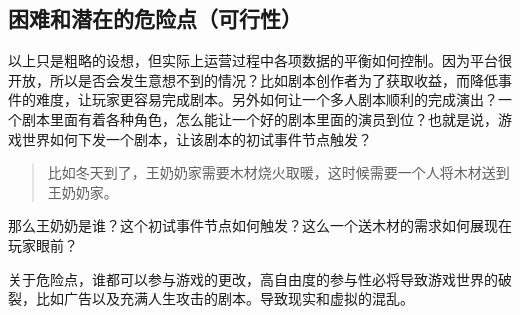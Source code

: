 \documentclass[
]{article}
\begin{document}
\hypertarget{header-n17}{%
\subsection{困难和潜在的危险点（可行性）}\label{header-n17}}

以上只是粗略的设想，但实际上运营过程中各项数据的平衡如何控制。因为平台很开放，所以是否会发生意想不到的情况？比如剧本创作者为了获取收益，而降低事件的难度，让玩家更容易完成剧本。另外如何让一个多人剧本顺利的完成演出？一个剧本里面有着各种角色，怎么能让一个好的剧本里面的演员到位？也就是说，游戏世界如何下发一个剧本，让该剧本的初试事件节点触发？

\begin{quote}
比如冬天到了，王奶奶家需要木材烧火取暖，这时候需要一个人将木材送到王奶奶家。
\end{quote}

那么王奶奶是谁？这个初试事件节点如何触发？这么一个送木材的需求如何展现在玩家眼前？

关于危险点，谁都可以参与游戏的更改，高自由度的参与性必将导致游戏世界的破裂，比如广告以及充满人生攻击的剧本。导致现实和虚拟的混乱。
\end{document}
